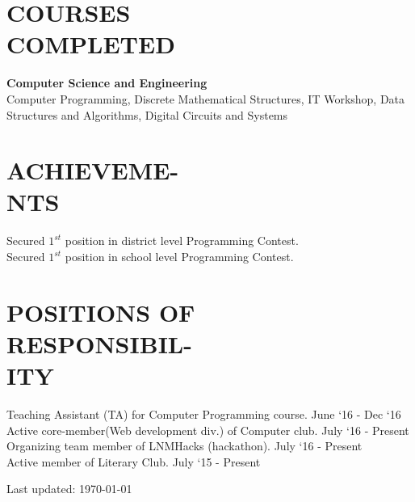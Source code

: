\documentclass[margin]{res}
\begin{document}
\begin{resume}
\section{COURSES \\ COMPLETED} {\textbf{Computer Science and Engineering}}\\
Computer Programming, Discrete Mathematical Structures, IT Workshop, Data Structures and Algorithms, Digital Circuits and Systems\\

\section{ACHIEVEME-\\NTS}
    Secured $1^{st}$ position in district level Programming Contest.\\
    Secured $1^{st}$ position in school level Programming Contest.\\

\section{POSITIONS OF\\ RESPONSIBIL-\\ITY}
    Teaching Assistant (TA) for Computer Programming course. \hfill June `16 - Dec `16\\
    Active core-member(Web development div.) of Computer club. \hfill July `16 - Present\\
    Organizing team member of LNMHacks (hackathon). \hfill July `16 - Present\\
	Active member of Literary Club. \hfill July `15 - Present\\


\begin{center}
  \begin{footnotesize}
    Last updated: \today \\
  \end{footnotesize}
\end{center}

\end{resume}
\end{document}
